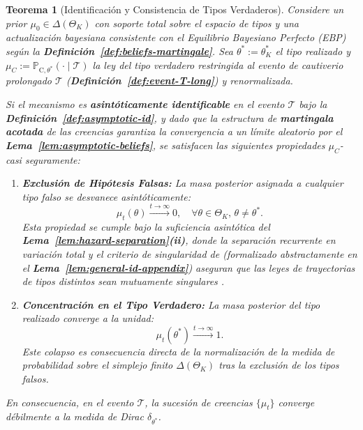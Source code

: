 \documentclass[12pt]{article}
\providecommand{\textcite}{\citet}
\newtheorem{theorem}{Teorema}[section]
\theoremstyle{definition}
\theoremstyle{remark}
\newcommand{\ProbC}[1]{\mathbb{P}_{\mathrm{C},#1}}
\newcommand{\1}{\mathbf{1}}
\begin{document}
\begin{theorem}[Identificación y Consistencia de Tipos Verdaderos]
\label{thm:posterior-consistency}
Considere un prior $\mu_0 \in \Delta(\Theta_K)$ con soporte total sobre el espacio de tipos y una actualización bayesiana consistente con el Equilibrio Bayesiano Perfecto (EBP) según la \textbf{Definición~\ref{def:beliefs-martingale}}. Sea $\theta^* := \theta_K^*$ el tipo realizado y $\mu_C := \ProbC{\theta^*}(\cdot \mid \mathcal{T})$ la ley del tipo verdadero restringida al evento de cautiverio prolongado $\mathcal{T}$ (\textbf{Definición~\ref{def:event-T-long}}) y renormalizada.

Si el mecanismo es \textbf{asintóticamente identificable} en el evento $\mathcal{T}$ bajo la \textbf{Definición~\ref{def:asymptotic-id}}, y dado que la estructura de \textbf{martingala acotada} de las creencias garantiza la convergencia a un límite aleatorio por el \textbf{Lema~\ref{lem:asymptotic-beliefs}}, se satisfacen las siguientes propiedades $\mu_C$-casi seguramente:

\begin{enumerate}
    \item \textbf{Exclusión de Hipótesis Falsas:} La masa posterior asignada a cualquier tipo falso se desvanece asintóticamente:
    \begin{equation*}
        \mu_t(\theta) \xrightarrow{t \to \infty} 0, \quad \forall \theta \in \Theta_K, \, \theta \neq \theta^*.
    \end{equation*}
    Esta propiedad se cumple bajo la suficiencia asintótica del \textbf{Lema~\ref{lem:hazard-separation}\textup{(ii)}}, donde la separación recurrente en variación total y el criterio de singularidad de \textcite{Kakutani1948} \textup{(}formalizado abstractamente en el \textbf{Lema~\ref{lem:general-id-appendix}}\textup{)} aseguran que las leyes de trayectorias de tipos distintos sean mutuamente singulares \textcite{Shiryaev2019Probability}.

    \item \textbf{Concentración en el Tipo Verdadero:} La masa posterior del tipo realizado converge a la unidad:
    \begin{equation*}
        \mu_t(\theta^*) \xrightarrow{t \to \infty} 1.
    \end{equation*}
    Este colapso es consecuencia directa de la normalización de la medida de probabilidad sobre el simplejo finito $\Delta(\Theta_K)$ tras la exclusión de los tipos falsos.
\end{enumerate}

En consecuencia, en el evento $\mathcal{T}$, la sucesión de creencias $\{\mu_t\}$ converge débilmente a la medida de Dirac $\delta_{\theta^*}$.
\end{theorem}
\end{document}
